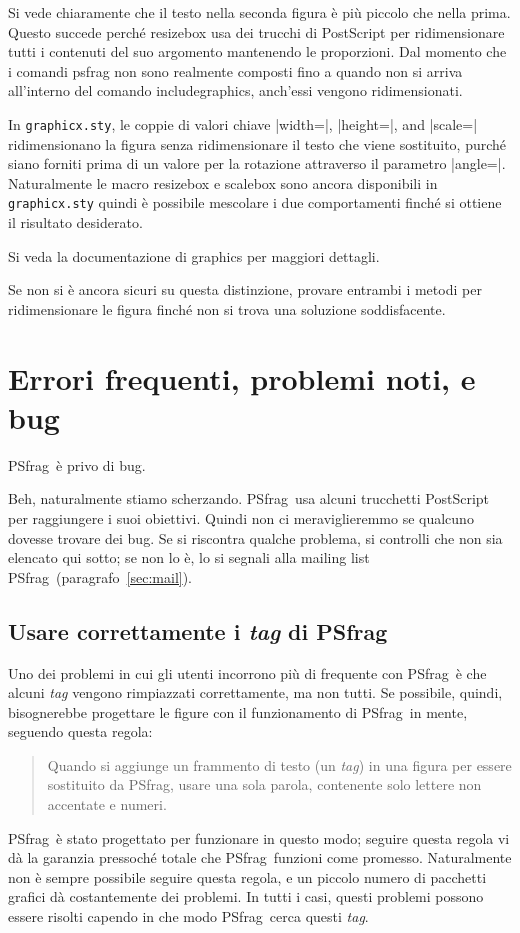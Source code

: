 \documentclass[a4paper,11pt]{ltxguide}
\let\pkg\textsf
\let\fname\texttt
\newcommand{\pfg}{\pkg{PSfrag}}
\def\cs#1{%
  {\ttfamily\expandafter\string\csname #1\endcsname}}
\begin{document}
Si vede chiaramente che il testo nella seconda figura \`e
pi\`u piccolo che nella prima.
Questo succede perch\'e \cs{resizebox} usa dei trucchi di PostScript per
ridimensionare tutti i contenuti del suo argomento mantenendo le proporzioni.
 Dal momento che i 
comandi \cs{psfrag} non sono realmente composti fino a quando non
si arriva all'interno del comando
\cs{includegraphics}, anch'essi vengono ridimensionati.

In \fname{graphicx.sty}, le coppie di valori chiave |width=|, |height=|,
and |scale=| ridimensionano la figura senza ridimensionare il testo che
viene sostituito, purch\'{e} siano forniti prima di un valore
per la rotazione attraverso il parametro |angle=|. Naturalmente le
macro \cs{resizebox} e \cs{scalebox}
sono ancora disponibili in \fname{graphicx.sty} quindi \`e possibile
mescolare %
i due comportamenti finch\'e si ottiene il risultato desiderato.
 
Si veda la documentazione di  \pkg{graphics} per maggiori dettagli.

Se non si \`e ancora sicuri su questa distinzione, provare entrambi i
metodi per ridimensionare le figura finch\'e non si trova una soluzione 
soddisfacente. 

\section{Errori frequenti, problemi noti, e bug}

\pfg\ \`e privo di bug.

Beh, naturalmente stiamo scherzando. \pfg\ usa alcuni trucchetti
PostScript per raggiungere i suoi obiettivi. Quindi non ci
meraviglieremmo se qualcuno dovesse trovare dei bug.  Se si riscontra
qualche problema, si controlli che non sia elencato qui sotto; se non
lo \`e, lo si segnali alla mailing list \pfg\ 
(paragrafo~\ref{sec:mail}).

\subsection{Usare correttamente i \emph{tag} di \pfg}
\label{sec:tags}

Uno dei problemi in cui gli utenti incorrono pi\`u di frequente con 
\pfg\  \`e che
alcuni \emph{tag} vengono rimpiazzati correttamente, ma non tutti. Se possibile,
quindi, bisognerebbe progettare le figure con il funzionamento di \pfg\ in mente, seguendo 
questa regola:
\begin{quote}
        Quando si aggiunge un frammento di testo (un \emph{tag}) in una figura 
        per essere sostituito da \pfg, usare una sola parola, 
        contenente solo lettere non accentate e numeri.    
\end{quote}
\pfg\  \`e stato progettato per funzionare in questo modo; 
seguire questa regola  vi d\`a la garanzia pressoch\'{e} totale 
che  \pfg\ funzioni come promesso. 
Naturalmente non \`e sempre possibile seguire questa regola, 
e un piccolo numero di pacchetti grafici d\`a costantemente dei problemi.
In tutti i casi, questi problemi possono essere risolti capendo in che modo 
 \pfg\  cerca questi \emph{tag}.
\end{document}
